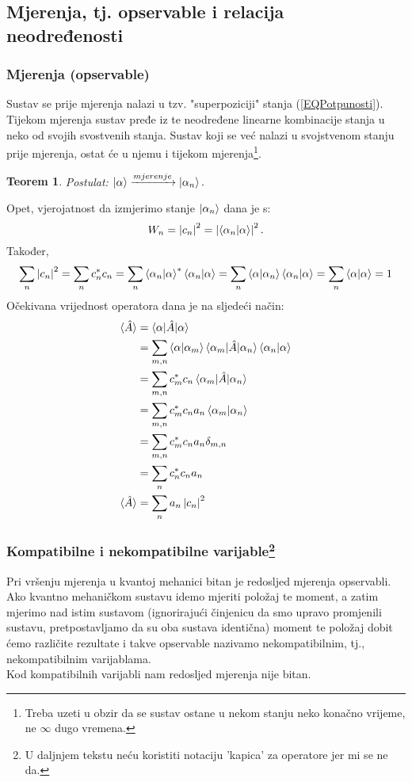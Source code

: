 \documentclass{article}
\newtheorem{theorem}{Teorem}[section]
\numberwithin{equation}{section}
\begin{document}
\subsection{Mjerenja, tj. opservable i relacija neodređenosti}
\subsubsection{Mjerenja (opservable)}
Sustav se prije mjerenja nalazi u tzv. "superpoziciji" stanja (\ref{EQPotpunosti}). Tijekom mjerenja
sustav pređe iz te neodređene linearne kombinacije stanja u neko od svojih svostvenih stanja.
Sustav koji se već nalazi u svojstvenom stanju prije mjerenja, ostat će u njemu i tijekom mjerenja\footnote{Treba uzeti u obzir da se sustav ostane u nekom stanju neko konačno vrijeme, ne $\infty$ dugo vremena.}.
\begin{theorem}
	Postulat: $\ket{\alpha} \xrightarrow{mjerenje} \ket{\alpha_n}.$
\end{theorem}
Opet, vjerojatnost da izmjerimo stanje $\ket{\alpha_n}$ dana je s: 
\begin{equation}
	W_n = \left|c_n\right|^2 = \left|\braket{\alpha_n|\alpha}\right|^2.
\end{equation}
Također,
\begin{equation}
	\sum_n \left|c_n\right|^2 = \sum_n c_n^*c_n = \sum_n \braket{\alpha_n|\alpha}^*\braket{\alpha_n|\alpha} = \sum_n \braket{\alpha|\alpha_n}\braket{\alpha_n|\alpha}
	=\sum_n \braket{\alpha|\alpha}= 1
\end{equation}
Očekivana vrijednost operatora dana je na sljedeći način:
\begin{equation}
	\begin{aligned}
		\braket{\hat{A}} &= \braket{\alpha|\hat{A}|\alpha}\\
										 &= \sum_{m,n} \braket{\alpha|\alpha_m}\braket{\alpha_m|\hat{A}|\alpha_n}\braket{\alpha_n|\alpha}\\
										 &= \sum_{m,n} c_m^*c_n \braket{\alpha_m|\hat{A}|\alpha_n}\\
										 &= \sum_{m,n} c_m^*c_n a_n \braket{\alpha_m|\alpha_n}\\
										 &= \sum_{m,n} c_m^*c_n a_n \delta_{m,n}\\
										 &= \sum_{n} c_n^*c_n a_n\\
		\braket{\hat{A}} &= \sum_n a_n \left|c_n\right|^2  
	\end{aligned}
\end{equation}
\subsubsection{Kompatibilne i nekompatibilne varijable\footnote{U daljnjem tekstu neću koristiti notaciju 'kapica' za operatore jer mi se ne da.}}
Pri vršenju mjerenja u kvantoj mehanici bitan je redosljed mjerenja opservabli. Ako kvantno mehaničkom sustavu idemo mjeriti
položaj te moment, a zatim mjerimo nad istim sustavom (ignorirajući činjenicu da smo upravo promjenili sustavu,
pretpostavljamo da su oba sustava identična) moment te položaj dobit ćemo različite rezultate i takve opservable nazivamo nekompatibilnim,
tj., nekompatibilnim varijablama.\\
Kod kompatibilnih varijabli nam redosljed mjerenja nije bitan.
\end{document}
